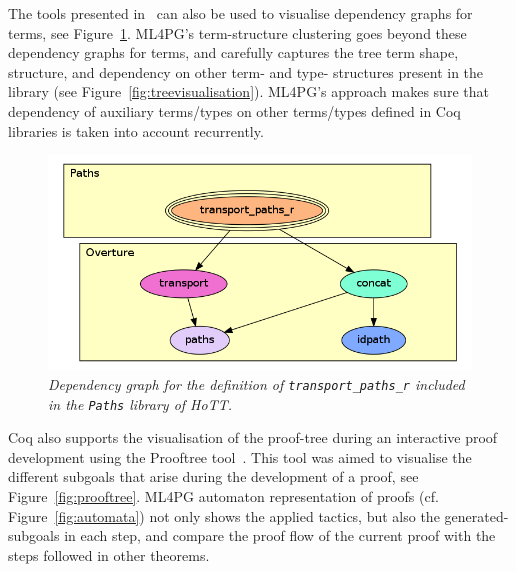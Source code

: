 The tools presented in~\cite{dpdgraph,BPP00} can also be used to visualise dependency graphs for terms, see Figure~\ref{fig:dgraph2}.
ML4PG’s term-structure clustering goes beyond these dependency graphs for terms, and carefully captures the tree term shape, structure,
and dependency on other term- and type- structures present in the library (see Figure~\ref{fig:treevisualisation}). ML4PG's approach makes sure that dependency of auxiliary terms/types on other terms/types defined in Coq libraries is taken into account recurrently.


\begin{figure}
\centering
\includegraphics[scale=.35]{graphpaths.png}
\caption{\scriptsize{\emph{Dependency graph for the definition of \texttt{transport\_paths\_r} included in the \texttt{Paths} library of HoTT.}}}\label{fig:dgraph2}
\end{figure}


Coq also supports the visualisation of the proof-tree during an interactive proof development using the Prooftree tool~\cite{prooftree}. This tool was aimed to visualise the different subgoals that arise during the development of a proof, see Figure~\ref{fig:prooftree}. ML4PG automaton representation of proofs (cf. Figure~\ref{fig:automata}) not only shows the applied tactics, but also the generated-subgoals in each step, and compare the proof flow of the current proof with the steps followed in other theorems.

